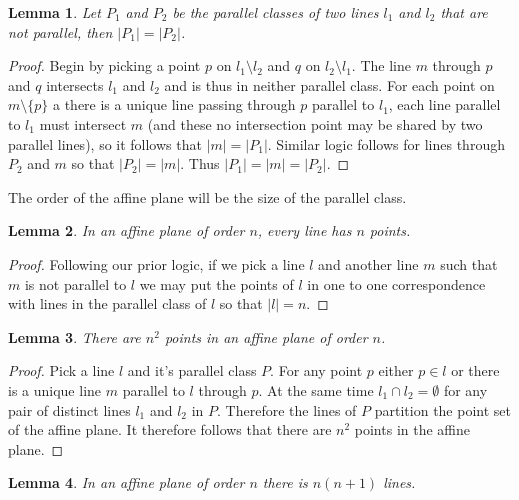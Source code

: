 \documentclass{article}
\newtheorem{lemma}{Lemma}
\begin{document}
    \begin{lemma}
      Let \(P_{1}\) and \(P_{2}\) be the parallel classes of two lines \(l_{1}\) and \(l_{2}\) that are not parallel, then \(|P_{1}| = |P_{2}|\).
    \end{lemma}
    \begin{proof}
      Begin by picking a point \(p\) on \(l_{1} \setminus l_{2}\) and \(q\) on \(l_{2} \setminus l_{1}\). The line \(m\) through \(p\) and \(q\) intersects \(l_{1}\) and \(l_{2}\) and is thus in neither parallel class. For each point on \(m \setminus \{p\}\) a there is a unique line passing through \(p\) parallel to \(l_{1}\), each line parallel to \(l_{1}\) must intersect \(m\)
      (and these no intersection point may be shared by two parallel lines), so it follows that \(|m| = |P_{1}|\). Similar logic follows for lines through \(P_{2}\) and \(m\) so that \(|P_{2}| = |m|\). Thus \(|P_{1}| = |m| = |P_{2}|\).
    \end{proof}

    The order of the affine plane will be the size of the parallel class.

    \begin{lemma}
In an affine plane of order \(n\), every line has \(n\) points.
\end{lemma}
\begin{proof}
Following our prior logic, if we pick a line \(l\) and another line \(m\) such that \(m\) is not parallel to \(l\) we may put the points of \(l\) in one to one correspondence with lines in the parallel class of \(l\) so that \(|l| = n\).
\end{proof}

\begin{lemma}
There are \(n^{2}\) points in an affine plane of order \(n\).
\end{lemma}
\begin{proof}
  Pick a line \(l\) and it's parallel class \(P\). For any point \(p\) either \(p \in l\) or there is a unique line \(m\) parallel to \(l\) through \(p\). At the same time \(l_{1} \cap l_{2} = \emptyset\) for any pair of distinct lines \(l_{1}\) and \(l_{2}\) in \(P\). Therefore the lines of \(P\) partition the point set of the affine plane.
  It therefore follows that there are \(n^{2}\) points in the affine plane.
\end{proof}

\begin{lemma}
In an affine plane of order \(n\) there is \(n(n + 1)\) lines.
\end{lemma}
\end{document}
